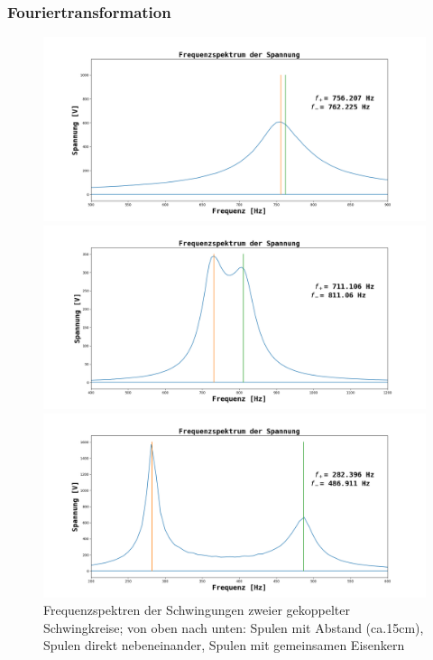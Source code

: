 \documentclass[12pt,a4paper]{article}
\begin{document}
\subsubsection{Fouriertransformation}
\begin{figure}
\begin{center}
\includegraphics[scale=0.4]{Bilder/Schwebung_Frequenzspektrum_Abstand.png}
\end{center}
\begin{center}
\includegraphics[scale=0.4]{Bilder/Schwebung_Frequenzspektrum.png}
\end{center}
\begin{center}
\includegraphics[scale=0.4]{Bilder/Schwebung_Frequenzspektrum_Eisenkern.png}
\end{center}
\caption[Frequenzspektrum Schwebung]{Frequenzspektren der Schwingungen zweier gekoppelter Schwingkreise; von oben nach unten: Spulen mit Abstand (ca.15cm), Spulen direkt nebeneinander, Spulen mit gemeinsamen Eisenkern}
\label{fig:Schwebung_Frequenzspektrum}
\end{figure}
\end{document}
